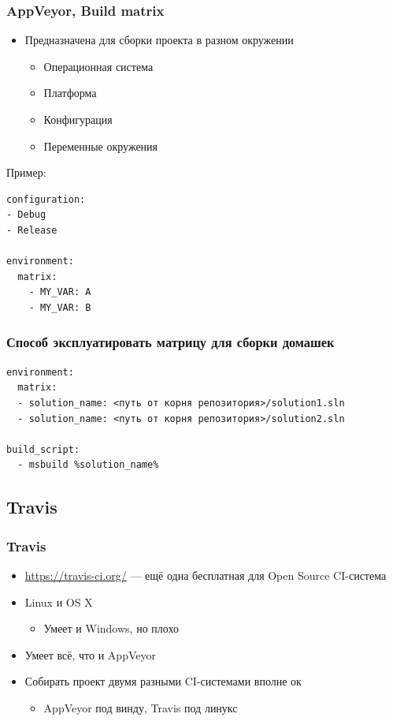 \documentclass[xetex,mathserif,serif]{beamer}
\begin{document}
	\begin{frame}[fragile]
		\frametitle{AppVeyor, Build matrix}
		\begin{itemize}
			\item Предназначена для сборки проекта в разном окружении
			\begin{itemize}
				\item Операционная система
				\item Платформа
				\item Конфигурация
				\item Переменные окружения
			\end{itemize}
		\end{itemize}
		Пример:
		\begin{verbatim}
configuration:
- Debug
- Release

environment:
  matrix:
    - MY_VAR: A
    - MY_VAR: B
		\end{verbatim}
	\end{frame}

	\begin{frame}[fragile]
		\frametitle{Способ эксплуатировать матрицу для сборки домашек}
		\begin{verbatim}
environment:
  matrix:
  - solution_name: <путь от корня репозитория>/solution1.sln
  - solution_name: <путь от корня репозитория>/solution2.sln

build_script:
  - msbuild %solution_name%
		\end{verbatim}
	\end{frame}

	\subsection{Travis}

	\begin{frame}
		\frametitle{Travis}
		\begin{itemize}
			\item \url{https://travis-ci.org/} --- ещё одна бесплатная для Open Source CI-система
			\item Linux и OS X
			\begin{itemize}
				\item Умеет и Windows, но плохо
			\end{itemize}
			\item Умеет всё, что и AppVeyor
			\item Собирать проект двумя разными CI-системами вполне ок
			\begin{itemize}
				\item AppVeyor под винду, Travis под линукс
			\end{itemize}
		\end{itemize}
	\end{frame}
\end{document}
